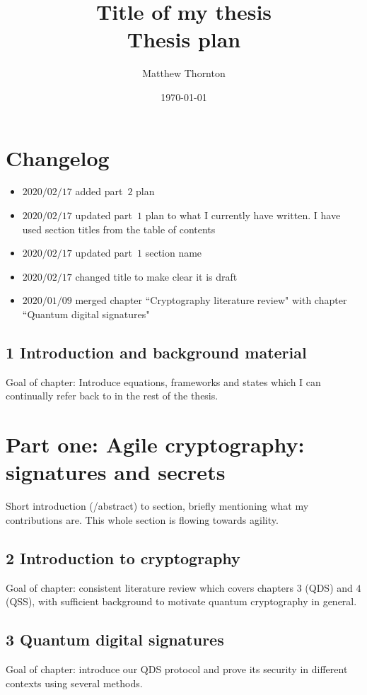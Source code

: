 \documentclass{article}
\title{Title of my thesis \\ \vspace{0.2in}  \Large Thesis plan}
\author{Matthew Thornton}
\date{\today}
\begin{document}
\maketitle 


\section*{Changelog}
\begin{itemize}
\item $2020/02/17$ added part~$2$ plan
\item $2020/02/17$ updated part~$1$ plan to what I currently have written. I have used section titles from the table of contents
\item $2020/02/17$ updated part~$1$ section name
\item $2020/02/17$ changed title to make clear it is draft
\item $2020/01/09$ merged chapter ``Cryptography literature review" with chapter ``Quantum digital signatures"
\end{itemize}

\subsection*{1 Introduction and background material}
Goal of chapter: Introduce equations, frameworks and states which I can continually refer back to in the rest of the thesis.

\section*{Part one: Agile cryptography: signatures and secrets}
Short introduction (/abstract) to section, briefly mentioning what my contributions are. This whole section is flowing towards agility.

\subsection*{2 Introduction to cryptography}
Goal of chapter: consistent literature review which covers chapters $3$ (QDS) and $4$ (QSS), with sufficient background to motivate quantum cryptography in general.

\subsection*{3 Quantum digital signatures}
Goal of chapter: introduce our QDS protocol and prove its security in different contexts using several methods.
\end{document}
